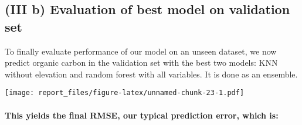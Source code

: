 \documentclass[
]{article}
\newenvironment{Shaded}{\begin{snugshade}}{\end{snugshade}}
\newcommand{\CommentTok}[1]{\textcolor[rgb]{0.56,0.35,0.01}{\textit{#1}}}
\newcommand{\DataTypeTok}[1]{\textcolor[rgb]{0.13,0.29,0.53}{#1}}
\newcommand{\DecValTok}[1]{\textcolor[rgb]{0.00,0.00,0.81}{#1}}
\newcommand{\KeywordTok}[1]{\textcolor[rgb]{0.13,0.29,0.53}{\textbf{#1}}}
\newcommand{\NormalTok}[1]{#1}
\newcommand{\OperatorTok}[1]{\textcolor[rgb]{0.81,0.36,0.00}{\textbf{#1}}}
\newcommand{\StringTok}[1]{\textcolor[rgb]{0.31,0.60,0.02}{#1}}
\begin{document}
\hypertarget{iii-b-evaluation-of-best-model-on-validation-set}{%
\subsection{(III b) Evaluation of best model on validation
set}\label{iii-b-evaluation-of-best-model-on-validation-set}}

To finally evaluate performance of our model on an unseen dataset, we
now predict organic carbon in the validation set with the best two
models: KNN without elevation and random forest with all variables. It
is done as an ensemble.

\begin{Shaded}
\end{Shaded}

\texttt{[image: report\_files/figure-latex/unnamed-chunk-23-1.pdf]}

\begin{Shaded}
\end{Shaded}

\hypertarget{this-yields-the-final-rmse-our-typical-prediction-error-which-is}{%
\paragraph{This yields the final RMSE, our typical prediction error,
which
is:}\label{this-yields-the-final-rmse-our-typical-prediction-error-which-is}}
\end{document}
